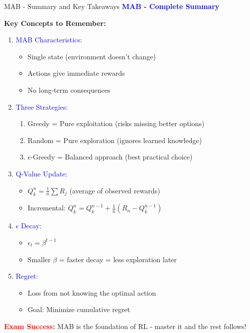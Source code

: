 \documentclass[8pt]{beamer}
\begin{document}
	\begin{frame}{MAB - Summary and Key Takeaways}
		\fontsize{6.5}{7.5}\selectfont
		\textcolor{blue}{\textbf{MAB - Complete Summary}}
		
		\textbf{Key Concepts to Remember:}
		
		\begin{enumerate}
			\item \textcolor{blue}{MAB Characteristics:}
			\begin{itemize}
				\item Single state (environment doesn't change)
				\item Actions give immediate rewards
				\item No long-term consequences
			\end{itemize}
			
			\item \textcolor{blue}{Three Strategies:}
			\begin{enumerate}
				\item Greedy = Pure exploitation (risks missing better options)
				\item Random = Pure exploration (ignores learned knowledge)
				\item $\epsilon$-Greedy = Balanced approach (best practical choice)
			\end{enumerate}
			
			\item \textcolor{blue}{Q-Value Update:}
			\begin{itemize}
				\item $Q_k^n = \frac{1}{n}\sum R_j$ (average of observed rewards)
				\item Incremental: $Q_k^n = Q_k^{n-1} + \frac{1}{n}(R_n - Q_k^{n-1})$
			\end{itemize}
			
			\item \textcolor{blue}{$\epsilon$ Decay:}
			\begin{itemize}
				\item $\epsilon_t = \beta^{t-1}$
				\item Smaller $\beta$ = faster decay = less exploration later
			\end{itemize}
			
			\item \textcolor{blue}{Regret:}
			\begin{itemize}
				\item Loss from not knowing the optimal action
				\item Goal: Minimize cumulative regret
			\end{itemize}
		\end{enumerate}
		
		\textcolor{red}{\textbf{Exam Success:}} MAB is the foundation of RL - master it and the rest follows!
	\end{frame}
	
\end{document}
